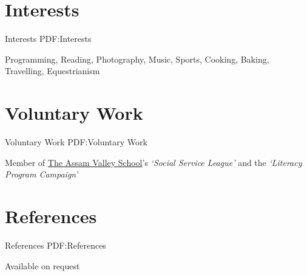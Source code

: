 \documentclass[a4paper,10pt,oneside]{article}
\begin{document}
\begin{body}



\section
{Interests}
{Interests}
{PDF:Interests}

Programming, Reading, Photography, Music, Sports, Cooking, Baking, Travelling, Equestrianism

\vspace{-5pt}
\hline

\section
{Voluntary Work}
{Voluntary Work}
{PDF:Voluntary Work}

Member of \href{http://www.assamvalleyschool.com}{The Assam Valley School}'s \textit{`Social Service League'} and the \textit{`Literacy Program Campaign'}

\vspace{-5pt}
\hline


\section
{References}
{References}
{PDF:References}

Available on request


\end{body}
\end{document}
